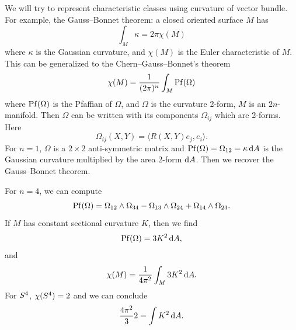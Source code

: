 \begin{node}
We will try to represent characteristic classes using curvature of
vector bundle. For example, the Gauss--Bonnet theorem: a closed
oriented surface $M$ has
\begin{equation}
\int_{M}\kappa=2\pi\chi(M)
\end{equation}
where $\kappa$ is the Gaussian curvature, and $\chi(M)$ is the Euler
characteristic of $M$. This can be generalized to the
Chern--Gauss--Bonnet's theorem
\begin{equation}
\chi(M) = \frac{1}{(2\pi)^{n}}\int_{M}\operatorname{Pf}(\Omega)
\end{equation}
where $\operatorname{Pf}(\Omega)$ is the Pfaffian of $\Omega$, and $\Omega$ is
the curvature 2-form, $M$ is an $2n$-manifold. Then $\Omega$ can be
written with its components $\Omega_{ij}$ which are 2-forms. Here
\begin{equation}
\Omega_{ij}(X,Y)=\langle R(X,Y)e_{j},e_{i}\rangle.
\end{equation}
For $n=1$, $\Omega$ is a $2\times 2$ anti-symmetric matrix and
$\operatorname{Pf}(\Omega)=\Omega_{12}=\kappa\,\mathrm{d} A$ is the Gaussian curvature
multiplied by the area 2-form $\mathrm{d} A$. Then we recover the
Gauss--Bonnet theorem.

For $n=4$, we can compute
\begin{equation}
\operatorname{Pf}(\Omega)=\Omega_{12}\wedge\Omega_{34}-\Omega_{13}\wedge\Omega_{24}+\Omega_{14}\wedge\Omega_{23}.
\end{equation}
If $M$ has constant sectional curvature $K$, then we find
\begin{equation}
\operatorname{Pf}(\Omega)=3K^{2}\,\mathrm{d} A,
\end{equation}
and
\begin{equation}
\chi(M)=\frac{1}{4\pi^{2}}\int_{M}3 K^{2}\,\mathrm{d} A.
\end{equation}
For $S^{4}$, $\chi(S^{4})=2$ and we can conclude
\begin{equation}
\frac{4\pi^{2}}{3}2=\int K^{2}\,\mathrm{d} A.
\end{equation}
\end{node}
